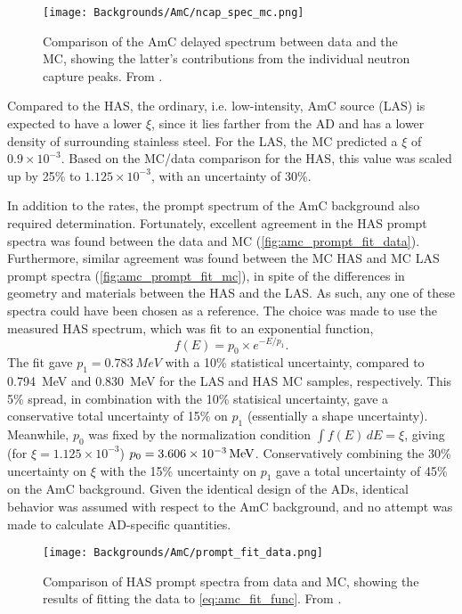 \documentclass[../thesis.tex]{subfiles}
\begin{document}
\begin{figure}[ht]
  \texttt{[image: Backgrounds/AmC/ncap\_spec\_mc.png]}
  \caption{Comparison of the AmC delayed spectrum between data and the MC, showing the latter's contributions from the individual neutron capture peaks. From \cite{Gu_2016}.}
  \label{fig:amc_ncap_spec_mc}
\end{figure}

Compared to the HAS, the ordinary, i.e. low-intensity, AmC source (LAS) is expected to have a lower $\xi$, since it lies farther from the AD and has a lower density of surrounding stainless steel. For the LAS, the MC predicted a $\xi$ of $0.9\times10^{-3}$. Based on the MC/data comparison for the HAS, this value was scaled up by 25\% to $1.125\times10^{-3}$, with an uncertainty of 30\%. 

In addition to the rates, the prompt spectrum of the AmC background also required determination. Fortunately, excellent agreement in the HAS prompt spectra was found between the data and MC (\autoref{fig:amc_prompt_fit_data}). Furthermore, similar agreement was found between the MC HAS and MC LAS prompt spectra (\autoref{fig:amc_prompt_fit_mc}), in spite of the differences in geometry and materials between the HAS and the LAS. As such, any one of these spectra could have been chosen as a reference. The choice was made to use the measured HAS spectrum, which was fit to an exponential function,
\begin{equation}
  f(E) = p_0 \times e^{-E/p_1}.
  \label{eq:amc_fit_func}
\end{equation}
The fit gave $p_1 = \SI{0.783}{MeV}$ with a 10\% statistical uncertainty, compared to \SI{0.794}{MeV} and \SI{0.830}{MeV} for the LAS and HAS MC samples, respectively. This 5\% spread, in combination with the 10\% statisical uncertainty, gave a conservative total uncertainty of 15\% on $p_1$ (essentially a shape uncertainty). Meanwhile, $p_0$ was fixed by the normalization condition $\int f(E)\,dE = \xi$, giving (for $\xi = 1.125\times10^{-3}$) $p_0 = \SI[parse-numbers = false]{3.606\times10^{-3}}{/MeV}$. Conservatively combining the 30\% uncertainty on $\xi$ with the 15\% uncertainty on $p_1$ gave a total uncertainty of 45\% on the AmC background. Given the identical design of the ADs, identical behavior was assumed with respect to the AmC background, and no attempt was made to calculate AD-specific quantities.

\begin{figure}[ht]
  \texttt{[image: Backgrounds/AmC/prompt\_fit\_data.png]}
  \caption{Comparison of HAS prompt spectra from data and MC, showing the results of fitting the data to \autoref{eq:amc_fit_func}. From \cite{Gu_2016}.}
  \label{fig:amc_prompt_fit_data}
\end{figure}
\end{document}
